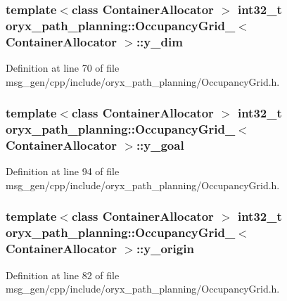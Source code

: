 \subsubsection[{y\-\_\-dim}]{\setlength{\rightskip}{0pt plus 5cm}template$<$class Container\-Allocator $>$ int32\-\_\-t {\bf oryx\-\_\-path\-\_\-planning\-::\-Occupancy\-Grid\-\_\-}$<$ \-Container\-Allocator $>$\-::{\bf y\-\_\-dim}}\label{structoryx__path__planning_1_1OccupancyGrid___ae1c198a00d0fedd528ac845402b35ea8}


\-Definition at line 70 of file msg\-\_\-gen/cpp/include/oryx\-\_\-path\-\_\-planning/\-Occupancy\-Grid.\-h.

\subsubsection[{y\-\_\-goal}]{\setlength{\rightskip}{0pt plus 5cm}template$<$class Container\-Allocator $>$ int32\-\_\-t {\bf oryx\-\_\-path\-\_\-planning\-::\-Occupancy\-Grid\-\_\-}$<$ \-Container\-Allocator $>$\-::{\bf y\-\_\-goal}}\label{structoryx__path__planning_1_1OccupancyGrid___adeca9e9ab109ae5ac320b6f159d11aed}


\-Definition at line 94 of file msg\-\_\-gen/cpp/include/oryx\-\_\-path\-\_\-planning/\-Occupancy\-Grid.\-h.

\subsubsection[{y\-\_\-origin}]{\setlength{\rightskip}{0pt plus 5cm}template$<$class Container\-Allocator $>$ int32\-\_\-t {\bf oryx\-\_\-path\-\_\-planning\-::\-Occupancy\-Grid\-\_\-}$<$ \-Container\-Allocator $>$\-::{\bf y\-\_\-origin}}\label{structoryx__path__planning_1_1OccupancyGrid___a36542e64d7c0082836f042df1a97e6c4}


\-Definition at line 82 of file msg\-\_\-gen/cpp/include/oryx\-\_\-path\-\_\-planning/\-Occupancy\-Grid.\-h.

